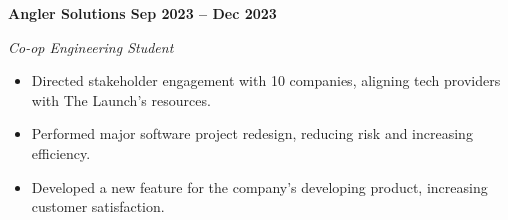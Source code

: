\vspace{0.1cm}
\textbf{Angler Solutions \hfill Sep 2023 -- Dec 2023} \par
\textit{Co-op Engineering Student} \par
\begin{itemize}
	\item Directed stakeholder engagement with 10 companies, aligning tech providers with The Launch’s resources.
  \item Performed major software project redesign, reducing risk and increasing efficiency.
  \item Developed a new feature for the company’s developing product, increasing customer satisfaction.
\end{itemize} \par
